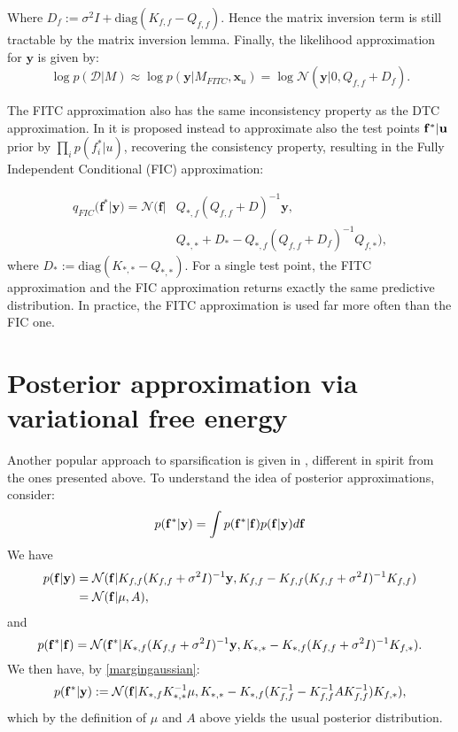 Where $D_f := \sigma^2 I + \text{diag}(K_{f,f} - Q_{f,f})$. Hence the matrix inversion term is still tractable by the matrix inversion lemma. Finally, the likelihood approximation for $\mathbf{y}$ is given by:
\begin{equation}
\log p(\mathcal{D}|M) \approx \log p(\mathbf{y}|M_{FITC},\mathbf{x}_u) = \log \mathcal{N}(\mathbf{y}|0,Q_{f,f} + D_f).
\end{equation}

The FITC approximation also has the same inconsistency property as the DTC approximation. In \cite{Snelson_2006} it is proposed instead to approximate also the test points ${\mathbf f}^*|{\mathbf u}$ prior by $\prod_{i}  p(f^*_i|u)$, recovering the consistency property, resulting in the Fully Independent Conditional (FIC) approximation:

\begin{equation}
\begin{split}
q_{FIC}(\mathbf{f}^*|\mathbf{y}) = \mathcal{N}(\mathbf{f}|&Q_{*,f}(Q_{f,f} + D)^{-1} \mathbf{y}, \\
& Q_{*,*} + D_* - Q_{*,f}(Q_{f,f} + D_f)^{-1} Q_{f,*}),
\end{split}
\end{equation}
where $D_* := \text{diag}(K_{*,*} - Q_{*,*})$.
For a single test point, the FITC approximation and the FIC approximation returns exactly the same predictive distribution. In practice, the FITC approximation is used far more often than the FIC one.

\section{Posterior approximation via variational free energy}

Another popular approach to sparsification is given in \cite{Titsias_2009}, different in spirit from the ones presented above. To understand the idea of posterior approximations, consider:
\begin{equation}
p({\mathbf f}^*|{\mathbf y}) = \int p({\mathbf f}^*|{\mathbf f}) p({\mathbf f}|{\mathbf y}) d {\mathbf f}
\end{equation}
We have 
\begin{equation*}
\begin{split}
p({\mathbf f}|{\mathbf y}) & = \mathcal{N}({\mathbf f}|K_{f,f}(K_{f,f} + \sigma^2 I)^{-1} {\mathbf y},K_{f,f} - K_{f,f}(K_{f,f} + \sigma^2 I)^{-1} K_{f,f}) \\
& = \mathcal{N}({\mathbf f}|\mu,A),
\end{split}
\end{equation*}
and
\begin{equation}
p({\mathbf f}^*|{\mathbf f}) = \mathcal{N}({\mathbf f}^*|K_{*,f}(K_{f,f} + \sigma^2 I)^{-1} {\mathbf y},K_{*,*} - K_{*,f}(K_{f,f} + \sigma^2 I)^{-1} K_{f,*}).
\end{equation}
We then have, by \eqref{margingaussian}:
\begin{equation} \label{gpmarginy}
p({\mathbf f}^*|{\mathbf y}) := \mathcal{N}({\mathbf f}|K_{*,f}K^{-1}_{*,*} \mu,K_{*,*} - K_{*,f}(K_{f,f}^{-1}-K_{f,f}^{-1} A K_{f,f}^{-1}) K_{f,*}),
\end{equation}
which by the definition of $\mu$ and $A$ above yields the usual posterior distribution. 

